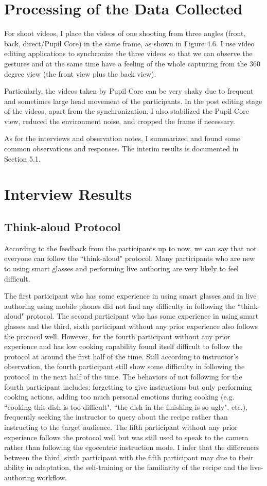 \documentclass[fyp]{socreport}
\begin{document}
\section{Processing of the Data Collected}
For shoot videos, I place the videos of one shooting from three angles (front, back, direct/Pupil Core) in the same frame, as shown in Figure 4.6. I use video editing applications to synchronize the three videos so that we can observe the gestures and at the same time have a feeling of the whole capturing from the 360 degree view (the front view plus the back view).

Particularly, the videos taken by Pupil Core can be very shaky due to frequent and sometimes large head movement of the participants. In the post editing stage of the videos, apart from the synchronization, I also stabilized the Pupil Core view, reduced the environment noise, and cropped the frame if necessary.

As for the interviews and observation notes, I summarized and found some common observations and responses. The interim results is documented in Section 5.1.

\section{Interview Results}
\subsection{Think-aloud Protocol}
According to the feedback from the participants up to now, we can say that not everyone can follow the ``think-aloud" protocol. Many participants who are new to using smart glasses and performing live authoring are very likely to feel difficult. 

The first participant who has some experience in using smart glasses and in live authoring using mobile phones did not find any difficulty in following the ``think-aloud" protocol. The second participant who has some experience in using smart glasses and the third, sixth participant without any prior experience also follows the protocol well. However, for the fourth participant without any prior experience and has low cooking capability found itself difficult to follow the protocol at around the first half of the time. Still according to instructor's observation, the fourth participant still show some difficulty in following the protocol in the next half of the time. The behaviors of not following for the fourth participant includes: forgetting to give instructions but only performing cooking actions, adding too much personal emotions during cooking (e.g. ``cooking this dish is too difficult", ``the dish in the finishing is so ugly", etc.), frequently seeking the instructor to query about the recipe rather than instructing to the target audience. The fifth participant without any prior experience follows the protocol well but was still used to speak to the camera rather than following the egocentric instruction mode. I infer that the differences between the third, sixth participant with the fifth participant may due to their ability in adaptation, the self-training or the familiarity of the recipe and the live-authoring workflow.
\end{document}
